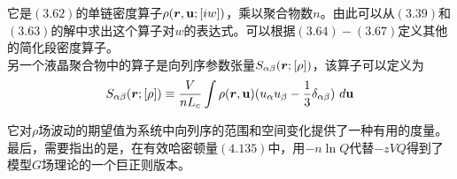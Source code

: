 它是$(3.62)$的单链密度算子$\rho(\bm{r},\mathbf{u};[i w])$，乘以聚合物数$n$。由此可以从$(3.39)$和$(3.63)$的解中求出这个算子对$w$的表达式。可以根据$(3.64)-(3.67)$定义其他的简化段密度算子。\\

另一个液晶聚合物中的算子是向列序参数张量$S_{\alpha \beta}(\bm{r};[\rho])$，该算子可以定义为\\
\begin{equation}
S_{\alpha \beta}(\bm{r};[\rho]) \equiv \frac{V}{n L_{c}} \int \rho(\bm{r},\mathbf{u})(u_{\alpha} u_{\beta}-\frac{1}{3} \delta_{\alpha \beta})~d\mathbf{u}
\end{equation}

它对$\rho$场波动的期望值为系统中向列序的范围和空间变化提供了一种有用的度量。最后，需要指出的是，在有效哈密顿量$(4.135)$中，用$-n \ln Q$代替$-z VQ$得到了模型$G$场理论的一个巨正则版本。\\

